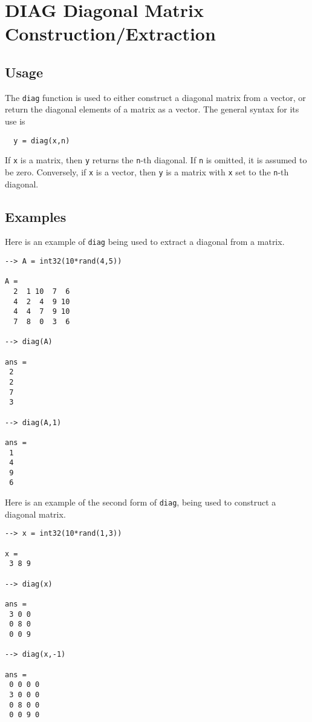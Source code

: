 \section{DIAG Diagonal Matrix Construction/Extraction}

\subsection{Usage}

The \verb|diag| function is used to either construct a 
diagonal matrix from a vector, or return the diagonal
elements of a matrix as a vector.  The general syntax
for its use is
\begin{verbatim}
  y = diag(x,n)
\end{verbatim}
If \verb|x| is a matrix, then \verb|y| returns the \verb|n|-th 
diagonal.  If \verb|n| is omitted, it is assumed to be
zero.  Conversely, if \verb|x| is a vector, then \verb|y|
is a matrix with \verb|x| set to the \verb|n|-th diagonal.
\subsection{Examples}

Here is an example of \verb|diag| being used to extract
a diagonal from a matrix.
\begin{verbatim}
--> A = int32(10*rand(4,5))

A = 
  2  1 10  7  6 
  4  2  4  9 10 
  4  4  7  9 10 
  7  8  0  3  6 

--> diag(A)

ans = 
 2 
 2 
 7 
 3 

--> diag(A,1)

ans = 
 1 
 4 
 9 
 6 
\end{verbatim}
Here is an example of the second form of \verb|diag|, being
used to construct a diagonal matrix.
\begin{verbatim}
--> x = int32(10*rand(1,3))

x = 
 3 8 9 

--> diag(x)

ans = 
 3 0 0 
 0 8 0 
 0 0 9 

--> diag(x,-1)

ans = 
 0 0 0 0 
 3 0 0 0 
 0 8 0 0 
 0 0 9 0 
\end{verbatim}
